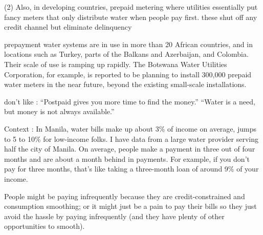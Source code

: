 \documentclass[12pt]{article}
\begin{document}
(2) Also, in developing countries, prepaid metering where utilities essentially put fancy meters that only distribute water when people pay first.  these shut off any credit channel but eliminate delinquency

\cite{heymans2014limits}
 prepayment water systems are in use in more than
20 African countries, and in locations such as Turkey, parts
of the Balkans and Azerbaijan, and Colombia. Their scale
of use is ramping up rapidly. The Botswana Water Utilities
Corporation, for example, is reported to be planning to install
300,000 prepaid water meters in the near future, beyond
the existing small-scale installations. 

don't like : “Postpaid gives you more time to find the money.”  “Water is a need, but money is not always available.”









Context : In Manila, water bills make up about 3\% of income on average, jumps to 5 to 10\% for low-income folks.  I have data from a large water provider serving half the city of Manila.  On average, people make a payment in three out of four months and are about a month behind in payments.  For example, if you don't pay for three months, that's like taking a three-month loan of around 9\% of your income.  

People might be paying infrequently because they are credit-constrained and consumption smoothing; or it might just be a pain to pay their bills so they just avoid the hassle by paying infrequently (and they have plenty of other opportunities to smooth).  
\end{document}
